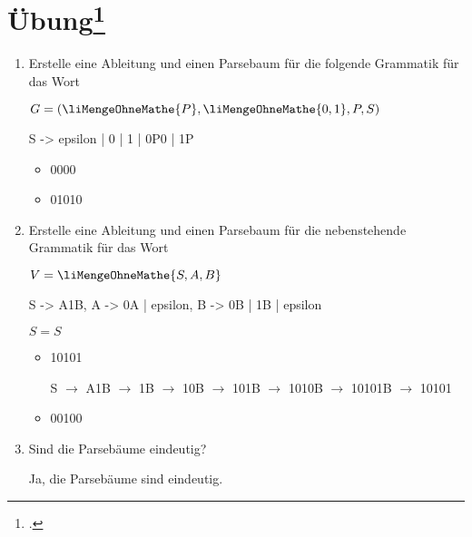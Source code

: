 \documentclass{lehramt-informatik-aufgabe}
\begin{document}
%

\section{Übung\footcite[Seite 18]{theo:fs:2}}

\let\m=\liMengeOhneMathe

\begin{enumerate}
\item Erstelle eine Ableitung und einen Parsebaum für die folgende
Grammatik für das Wort

$G = ( \m{P} , \m{ 0, 1 }, P, S)$

\begin{liProduktionsRegeln}
S -> epsilon | 0 | 1 | 0P0 | 1P
\end{liProduktionsRegeln}

\begin{itemize}
\item 0000
\item 01010
\end{itemize}

\item Erstelle eine Ableitung und einen Parsebaum für die nebenstehende
Grammatik für das Wort

$V = \m{ S, A, B }$


\begin{liProduktionsRegeln}
S -> A1B,
A -> 0A | epsilon,
B -> 0B | 1B | epsilon
\end{liProduktionsRegeln}

$S = S$

\begin{itemize}
\item 10101

\begin{liAntwort}
\def\p{ $\rightarrow$ }

S \p A1B \p 1B \p 10B \p 101B \p 1010B \p 10101B \p 10101

\end{liAntwort}

\item 00100
\end{itemize}

\item Sind die Parsebäume eindeutig?

\begin{liAntwort}
Ja, die Parsebäume sind eindeutig.
\end{liAntwort}
\end{enumerate}
\end{document}
